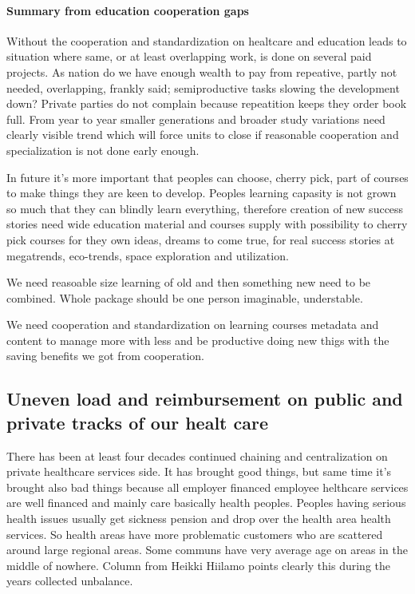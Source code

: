 \paragraph{Summary from education cooperation gaps}
\label{education_cooperation_gaps}

Without the cooperation and standardization on healtcare and education leads
to situation where same, or at least overlapping work, is done on several paid
projects. As nation do we have enough wealth to pay from repeative, partly not
needed, overlapping, frankly said; semi\-productive tasks slowing the
development down? Private parties do not complain because repeatition keeps
they order book full. From year to year smaller generations and broader study
variations need clearly visible trend which will force units to close if
reasonable cooperation and specialization is not done early enough.

In future it's more important that peoples can choose, cherry pick, part of
courses to make things they are keen to develop. Peoples learning capasity
is not grown so much that they can blindly learn everything, therefore
creation of new success stories need wide education material and courses
supply with possibility to cherry pick courses for they own ideas, dreams
to come true, for real success stories at megatrends, eco-trends, space
exploration and utilization.

We need reasoable size learning of old and then something new need to
be combined. Whole package should be one person imaginable, understable.

We need cooperation and standardization on learning courses metadata and
content to manage more with less and be productive doing new thigs with
the saving benefits we got from cooperation.

\subsection{Uneven load and reimbursement on public and private tracks of our healt care}
\label{unbalance_on_two_tracks}
There has been at least four decades continued chaining and centralization on
private healthcare services side. It has brought good things, but same time
it's brought also bad things because all employer financed employee helthcare
services are well financed and mainly care basically health peoples. Peoples
having serious health issues usually get sickness pension and drop over the
health area health services. So health areas have more problematic customers
who are scattered around large regional areas. Some communs have very average
age on areas in the middle of nowhere. Column from Heikki Hiilamo
\cite{HiilamonKolumni202411250645} points clearly this during the years
collected unbalance.

